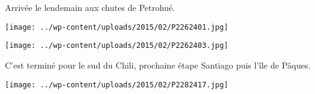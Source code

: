 \pagebreak
Arrivée le lendemain aux chutes de Petrohué.
\begin{center} \texttt{[image: ../wp-content/uploads/2015/02/P2262401.jpg]} \end{center}
\begin{center} \texttt{[image: ../wp-content/uploads/2015/02/P2262403.jpg]} \end{center}
\vspace{-\topsep}
\vspace{-3.25mm}

\pagebreak
 C'est terminé pour le sud du Chili, prochaine étape Santiago puis l'île de Pâques.
\begin{center} \texttt{[image: ../wp-content/uploads/2015/02/P2282417.jpg]} \end{center}
